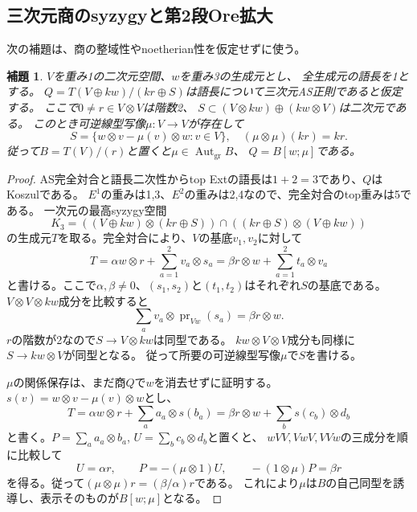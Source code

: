 \documentclass[11pt,a4paper]{ltjsarticle}
\newtheorem{lemma}[theorem]{補題}
\theoremstyle{definition}
\newcommand{\Aut}{\operatorname{Aut}}
\begin{document}
\subsection{三次元商のsyzygyと第2段Ore拡大}
次の補題は、商の整域性やnoetherian性を仮定せずに使う。
\begin{lemma}\label{idx:lem:three-generator}
$V$を重み1の二次元空間、$w$を重み3の生成元とし、
全生成元の語長を1とする。
$Q=T(V\oplus kw)/(kr\oplus S)$は語長について三次元AS正則であると仮定する。
ここで$0\ne r\in V\otimes V$は階数2、
$S\subset (V\otimes kw)\oplus(kw\otimes V)$は二次元である。
このとき可逆線型写像$\mu:V\to V$が存在して
\[
S=\{w\otimes v-\mu(v)\otimes w:v\in V\},\quad
(\mu\otimes\mu)(kr)=kr.
\]
従って$B=T(V)/(r)$と置くと$\mu\in\Aut_{\mathrm{gr}}B$、
$Q=B[w;\mu]$である。
\end{lemma}
\begin{proof}
AS完全対合と語長二次性からtop Extの語長は$1+2=3$であり、$Q$はKoszulである。
$E^1$の重みは1,3、$E^2$の重みは2,4なので、完全対合のtop重みは5である。
一次元の最高syzygy空間
\[
K_3=((V\oplus kw)\otimes(kr\oplus S))
\cap((kr\oplus S)\otimes(V\oplus kw))
\]
の生成元$T$を取る。完全対合により、$V$の基底$v_1,v_2$に対して
\begin{equation}\label{idx:eq:top-syzygy}
T=\alpha w\otimes r+\sum_{a=1}^2v_a\otimes s_a
=\beta r\otimes w+\sum_{a=1}^2t_a\otimes v_a
\end{equation}
と書ける。ここで$\alpha,\beta\ne0$、$(s_1,s_2)$と$(t_1,t_2)$はそれぞれ$S$の基底である。
$V\otimes V\otimes kw$成分を比較すると
\[
\sum_a v_a\otimes\operatorname{pr}_{Vw}(s_a)=\beta r\otimes w.
\]
$r$の階数が2なので$S\to V\otimes kw$は同型である。
$kw\otimes V\otimes V$成分も同様に$S\to kw\otimes V$が同型となる。
従って所要の可逆線型写像$\mu$で$S$を書ける。

$\mu$の関係保存は、まだ商$Q$で$w$を消去せずに証明する。
$s(v)=w\otimes v-\mu(v)\otimes w$とし、
\[
T=\alpha w\otimes r+\sum_a a_a\otimes s(b_a)
=\beta r\otimes w+\sum_b s(c_b)\otimes d_b
\]
と書く。$P=\sum_a a_a\otimes b_a$,
$U=\sum_b c_b\otimes d_b$と置くと、
$wVV,VwV,VVw$の三成分を順に比較して
\[
U=\alpha r,\qquad
P=-(\mu\otimes1)U,\qquad
-(1\otimes\mu)P=\beta r
\]
を得る。従って$(\mu\otimes\mu)r=(\beta/\alpha)r$である。
これにより$\mu$は$B$の自己同型を誘導し、表示そのものが$B[w;\mu]$となる。
\end{proof}
\end{document}
